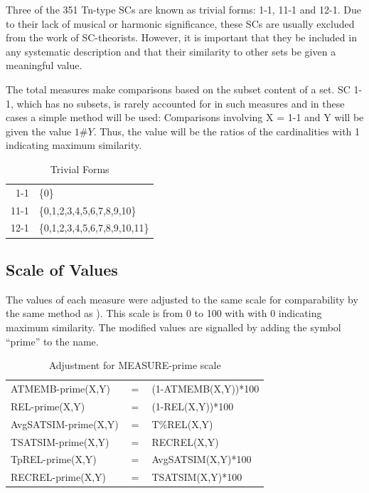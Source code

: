 \documentclass{article}
\begin{document}
Three of the 351 Tn-type SCs are known as trivial forms: 1-1, 11-1 and
12-1. Due to their lack of musical or harmonic significance, these SCs
are usually excluded from the work of SC-theorists. However, it is
important that they be included in any systematic description and that
their similarity to other sets be given a meaningful value.

The total measures make comparisons based on the subset content of a
set. SC 1-1, which has no subsets, is rarely accounted for in such
measures and in these cases a simple method will be used: Comparisons
involving X = 1-1 and Y will be given the value $1\#Y$. Thus, the
value will be the ratios of the cardinalities with 1 indicating
maximum similarity.
\begin{table}[htb]
\caption{Trivial Forms} 
\begin{center}
\begin{tabular}{rl}
  1-1  &  \{0\}                          \\
 11-1  &  \{0,1,2,3,4,5,6,7,8,9,10\}     \\
 12-1  &  \{0,1,2,3,4,5,6,7,8,9,10,11\}  \\
\end{tabular}
\end{center}
\end{table}
\subsection{Scale of Values}
\label{sec-12-2}

The values of each measure were adjusted to the same scale for
comparability by the same method as \citet[pp. 48]{Kuusi2001}). This
scale is from 0 to 100 with with 0 indicating maximum similarity. The
modified values are signalled by adding the symbol ``prime'' to the
name.
\begin{table}[htb]
\caption{Adjustment for MEASURE-prime scale} 
\begin{center}
\begin{tabular}{lll}
 ATMEMB-prime(X,Y)     &  $=$  &  (1-ATMEMB(X,Y))*100  \\
 REL-prime(X,Y)        &  $=$  &  (1-REL(X,Y))*100     \\
 AvgSATSIM-prime(X,Y)  &  $=$  &  T\%REL(X,Y)          \\
 TSATSIM-prime(X,Y)    &  $=$  &  RECREL(X,Y)          \\
 TpREL-prime(X,Y)      &  $=$  &  AvgSATSIM(X,Y)*100   \\
 RECREL-prime(X,Y)     &  $=$  &  TSATSIM(X,Y)*100     \\
\end{tabular}
\end{center}
\end{table}
\end{document}
